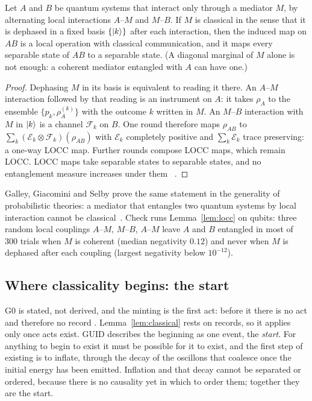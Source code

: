 \begin{lemma}\label{lem:locc}
Let $A$ and $B$ be quantum systems that interact only through a mediator $M$, by alternating local interactions $A$--$M$ and $M$--$B$. If
$M$ is classical in the sense that it is dephased in a fixed basis $\{\lvert k\rangle\}$ after each interaction, then the induced map on $AB$ is a
local operation with classical communication, and it maps every separable state of $AB$ to a separable state. (A diagonal marginal of $M$
alone is not enough: a coherent mediator entangled with $A$ can have one.)
\end{lemma}

\begin{proof}
Dephasing $M$ in its basis is equivalent to reading it there. An $A$--$M$ interaction followed by that reading is an instrument on $A$: it
takes $\rho_A$ to the ensemble $\{p_k,\rho_A^{(k)}\}$ with the outcome $k$ written in $M$. An $M$--$B$ interaction with $M$ in $\lvert k\rangle$ is a
channel $\mathcal F_k$ on $B$. One round therefore maps $\rho_{AB}$ to $\sum_k(\mathcal E_k\otimes\mathcal F_k)(\rho_{AB})$ with
$\mathcal E_k$ completely positive and $\sum_k\mathcal E_k$ trace preserving: a one-way LOCC map. Further rounds compose LOCC maps, which
remain LOCC. LOCC maps take separable states to separable states, and no entanglement measure increases under them~\cite{vw} \tagP.
\end{proof}

Galley, Giacomini and Selby prove the same statement in the generality of probabilistic theories: a mediator that entangles two quantum
systems by local interaction cannot be classical~\cite{ggs}. Check  runs Lemma~\ref{lem:locc} on qubits: three random local
couplings $A$--$M$, $M$--$B$, $A$--$M$ leave $A$ and $B$ entangled in most of 300 trials when $M$ is coherent (median negativity $0.12$)
and never when $M$ is dephased after each coupling (largest negativity below $10^{-12}$).

\subsection{Where classicality begins: the start}\label{sec:start}

G0 is stated, not derived, and the minting is the first act: before it there is no act and therefore no record \tagD.
Lemma~\ref{lem:classical} rests on records, so it applies only once acts exist. GUID describes the beginning as one event, the
\emph{start}. For anything to begin to exist it must be possible for it to exist, and the first step of existing is to inflate, through the
decay of the oscillons that coalesce once the initial energy has been emitted. Inflation and that decay cannot be separated or ordered,
because there is no causality yet in which to order them; together they are the start.

